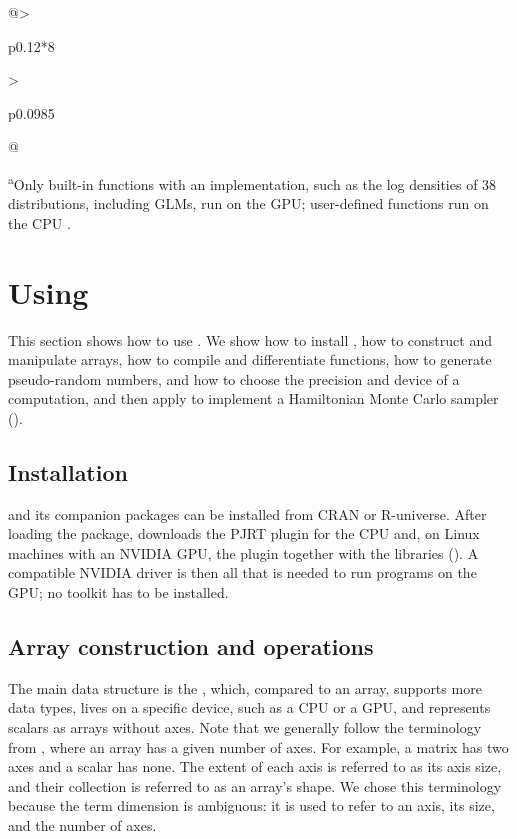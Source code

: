 \documentclass[article,shortnames]{jss}
\begin{document}
\begin{table}
\begin{tabular}{@{}>{\raggedright\arraybackslash}p{0.12\textheight}*{8}{>{\raggedright\arraybackslash}p{0.0985\textheight}}@{}}
\hline
\end{tabular}
\begin{minipage}{\linewidth}
\footnotesize\smallskip
\textsuperscript{a}Only built-in functions with an  implementation, such as the log densities of 38 distributions, including GLMs, run on the GPU; user-defined functions run on the CPU \citep{ref-stan-guide}.
\end{minipage}
\caption{Comparison of  with  packages for compiled or differentiable numerical computing.  is used via  or . All packages run on the CPU. --: not available.}
\label{tab:comparison}
\end{table}

\section[Using anvl]{Using }\label{usage}

This section shows how to use .
We show how to install , how to construct and manipulate arrays, how to compile and differentiate functions, how to generate pseudo-random numbers, and how to choose the precision and device of a computation, and then apply  to implement a Hamiltonian Monte Carlo sampler ().

\subsection{Installation}\label{installation}

 and its companion packages can be installed from CRAN or R-universe.
After loading the package,  downloads the PJRT plugin for the CPU and, on Linux machines with an NVIDIA GPU, the  plugin together with the  libraries ().
A compatible NVIDIA driver is then all that is needed to run programs on the GPU; no  toolkit has to be installed.

\subsection{Array construction and operations}\label{eager}

The main data structure is the , which, compared to an  array, supports more data types, lives on a specific device, such as a CPU or a GPU, and represents scalars as arrays without axes.
Note that we generally follow the terminology from , where an array has a given number of axes. For example, a matrix has two axes and a scalar has none.
The extent of each axis is referred to as its axis size, and their collection is referred to as an array's shape.
We chose this terminology because the term dimension is ambiguous: it is used to refer to an axis, its size, and the number of axes.
\end{document}
